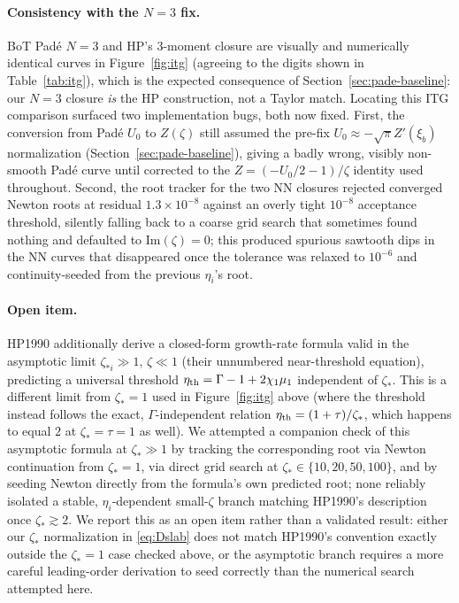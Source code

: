 \documentclass[11pt]{article}
\newcommand{\xib}{\xi_b}
\begin{document}
\paragraph{Consistency with the $N=3$ fix.} BoT Pad\'e $N{=}3$ and HP's
3-moment closure are visually and numerically identical curves in
Figure~\ref{fig:itg} (agreeing to the digits shown in
Table~\ref{tab:itg}), which is the expected consequence of
Section~\ref{sec:pade-baseline}: our $N{=}3$ closure \emph{is} the HP
construction, not a Taylor match. Locating this ITG comparison surfaced
two implementation bugs, both now fixed. First, the conversion from
Pad\'e $U_0$ to $Z(\zeta)$ still assumed the pre-fix $U_0\approx
-\sqrt\pi Z'(\xib)$ normalization (Section~\ref{sec:pade-baseline}),
giving a badly wrong, visibly non-smooth Pad\'e curve until corrected
to the $Z=(-U_0/2-1)/\zeta$ identity used throughout. Second, the root
tracker for the two NN closures rejected converged Newton roots at
residual $1.3\times10^{-8}$ against an overly tight
$10^{-8}$ acceptance threshold, silently falling back to a coarse grid
search that sometimes found nothing and defaulted to $\mathrm{Im}
(\zeta){=}0$; this produced spurious sawtooth dips in the NN curves
that disappeared once the tolerance was relaxed to $10^{-6}$ and
continuity-seeded from the previous $\eta_i$'s root.

\paragraph{Open item.} HP1990 additionally derive a closed-form
growth-rate formula valid in the asymptotic limit $\zeta_{*i}\gg1$,
$\zeta\ll1$ (their unnumbered near-threshold equation), predicting a
universal threshold $\eta_{\rm th}=\Gamma-1+2\chi_1\mu_1$ independent
of $\zeta_*$. This is a different limit from $\zeta_*=1$ used in
Figure~\ref{fig:itg} above (where the threshold instead follows the
exact, $\Gamma$-independent relation $\eta_{\rm th}=(1+\tau)/\zeta_*$,
which happens to equal $2$ at $\zeta_*=\tau=1$ as well). We attempted a
companion check of this asymptotic formula at $\zeta_*\gg1$ by tracking
the corresponding root via Newton continuation from $\zeta_*=1$,
via direct grid search at $\zeta_*\in\{10,20,50,100\}$, and by seeding
Newton directly from the formula's own predicted root; none reliably
isolated a stable, $\eta_i$-dependent small-$\zeta$ branch matching
HP1990's description once $\zeta_*\gtrsim2$. We report this as an open
item rather than a validated result: either our $\zeta_*$ normalization
in \eqref{eq:Dslab} does not match HP1990's convention exactly outside
the $\zeta_*=1$ case checked above, or the asymptotic branch requires a
more careful leading-order derivation to seed correctly than the
numerical search attempted here.
\end{document}
